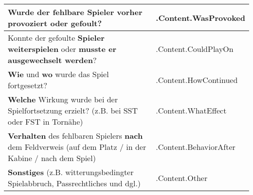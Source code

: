 \documentclass[a4paper, 11pt]{article}
\begin{document}
\begin{longtable}[]{@{}
        |>{\raggedright\arraybackslash}p{}
        |>{\raggedright\arraybackslash}p{}|@{}}
        \textbf{Wurde} der fehlbare Spieler vorher provoziert oder gefoult?                                                      & {{ .Content.WasProvoked }}   \\\hline
        Konnte der gefoulte \textbf{Spieler weiterspielen} oder \textbf{musste er ausgewechselt werden}? & {{ .Content.CouldPlayOn }} \\\hline
        \textbf{Wie} und \textbf{wo} wurde das Spiel fortgesetzt?                                                                & {{ .Content.HowContinued }}  \\\hline
        \textbf{Welche} Wirkung wurde bei der Spielfortsetzung erzielt? (z.B. bei SST oder FST in Tornähe) & {{ .Content.WhatEffect }} \\\hline
        \textbf{Verhalten} des fehlbaren Spielers \textbf{nach} dem Feldverweis (auf dem Platz / in der Kabine / nach dem Spiel) & {{ .Content.BehaviorAfter }} \\\hline
        \textbf{Sonstiges} (z.B. witterungsbedingter Spielabbruch, Passrechtliches und dgl.) & {{ .Content.Other }} \\
        \hline
    \end{longtable}
\end{document}
